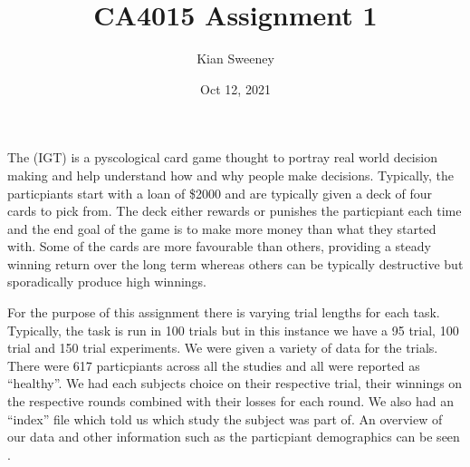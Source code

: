 \documentclass[letterpaper,10pt,english]{jupyterBook}
\title{CA4015 Assignment 1}
\date{Oct 12, 2021}
\author{Kian Sweeney}
\begin{document}
\pagestyle{empty}
\sphinxmaketitle
\pagestyle{plain}
\sphinxtableofcontents
\pagestyle{normal}
\label{\detokenize{introduction::doc}}


\begin{DUlineblock}{0em}
\item[] 
\end{DUlineblock}

\begin{DUlineblock}{0em}
\item[] 
\end{DUlineblock}

\sphinxAtStartPar
The (IGT) is a pyscological card game thought to portray real world decision making and help understand how and why people make decisions. Typically, the particpiants start with a loan of \$2000 and are typically given a deck of four cards to pick from. The deck either rewards or punishes the particpiant each time and the end goal of the game is to make more money than what they started with. Some of the cards are more favourable than others, providing a steady winning return over the long term whereas others can be typically destructive but sporadically produce high winnings.

\sphinxAtStartPar
{}

\begin{DUlineblock}{0em}
\item[] 
\end{DUlineblock}

\sphinxAtStartPar
For the purpose of this assignment there is varying trial lengths for each task. Typically, the task is run in 100 trials but in this instance we have a 95 trial, 100 trial and 150 trial experiments. We were given a variety of data for the trials. There were 617 particpiants across all the studies and all were reported as “healthy”. We had each subjects choice on their respective trial, their winnings on the respective rounds combined with their losses for each round. We also had an “index” file which told us which study the subject was part of. An overview of our data and other information such as the particpiant demographics can be seen .

\begin{DUlineblock}{0em}
\item[] 
\end{DUlineblock}
\end{document}
